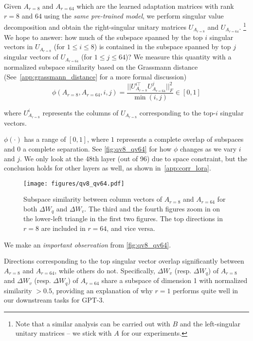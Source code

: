 Given $A_{r=8}$ and $A_{r=64}$ which are the learned adaptation matrices with rank $r = 8$ and $64$ using the \emph{same pre-trained model}, we perform singular value decomposition and obtain the right-singular unitary matrices $U_{A_{r=8}}$ and $U_{A_{r=64}}$.%
\footnote{Note that a similar analysis can be carried out with $B$ and the left-singular unitary matrices -- we stick with $A$ for our experiments.}
We hope to answer: how much of the subspace spanned by the top $i$ singular vectors in $U_{A_{r=8}}$ (for $1\leq i \leq 8$) is contained in the subspace spanned by top $j$ singular vectors of $U_{A_{r=64}}$  (for $1\leq j \leq 64$)?
We measure this quantity with a normalized subspace similarity based on the Grassmann distance (See~\autoref{app:grassmann_distance} for a more formal discussion)
\begin{equation}
  \phi(A_{r=8}, A_{r=64}, i, j) = \frac{||U_{A_{r=8}}^{i\top} U_{A_{r=64}}^j||_{F}^2}{\min(i, j)} \in [0,1]
  \label{eq:overlap}
\end{equation}

where $U_{A_{r=8}}^i$ represents the columns of $U_{A_{r=8}}$ corresponding to the top-$i$ singular vectors.

$\phi(\cdot)$ has a range of $[0, 1]$, where $1$ represents a complete overlap of subspaces and $0$ a complete separation.
See \autoref{fig:qv8_qv64} for how $\phi$ changes as we vary $i$ and $j$.
We only look at the 48th layer (out of 96) due to space constraint, but the conclusion holds for other layers as well, as shown in~\autoref{app:corr_lora}.
\begin{figure}[h]
  \centering
    \texttt{[image: figures/qv8\_qv64.pdf]}
    \caption{Subspace similarity between column vectors of $A_{r=8}$ and $A_{r=64}$ for both $\Delta W_q$ and $\Delta W_v$. The third and the fourth figures zoom in on the lower-left triangle in the first two figures. The top directions in $r=8$ are included in $r=64$, and vice versa.}
    \label{fig:qv8_qv64}
\end{figure}

We make an \emph{important observation} from \autoref{fig:qv8_qv64}.

\begin{center}
\parbox{0.85\linewidth}{
Directions corresponding to the top singular vector overlap significantly between $A_{r=8}$ and $A_{r=64}$, while others do not. Specifically, $\Delta W_v$ (resp. $\Delta W_q$) of $A_{r=8}$ and $\Delta W_v$ (resp. $\Delta W_q$) of $A_{r=64}$ share a subspace of dimension 1 with normalized similarity $>0.5$, providing an explanation of why $r=1$ performs quite well in our downstream tasks for GPT-3.}
\end{center}

